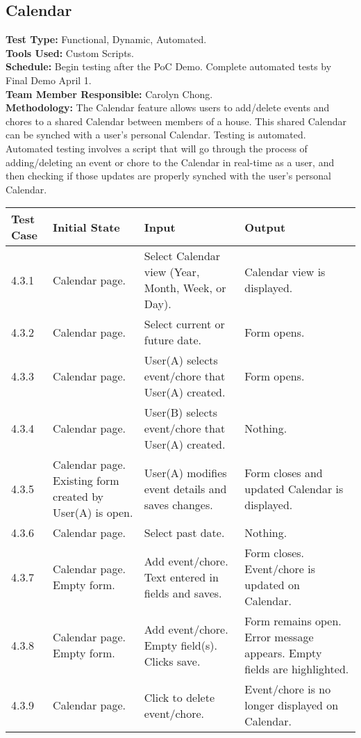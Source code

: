 \documentclass[12pt]{article}
\begin{document}
\subsection{Calendar}
\textbf{Test Type:} Functional, Dynamic, Automated. \\
\textbf{Tools Used:} Custom Scripts. \\
\textbf{Schedule:} Begin testing after the PoC Demo. Complete automated tests by Final Demo April 1. \\
\textbf{Team Member Responsible:} Carolyn Chong. \\
\textbf{Methodology:} The Calendar feature allows users to add/delete events and chores to a shared Calendar between members of a house. This shared Calendar can be synched with a user's personal Calendar. Testing is automated. Automated testing involves a script that will go through the process of adding/deleting an event or chore to the Calendar in real-time as a user, and then checking if those updates are properly synched with the user's personal Calendar. 

\begin{longtable}{|p{2cm}|p{3cm}|p{5cm}|p{5cm}|}
\hline
\textbf{Test Case}  & \textbf{Initial State} & \textbf{Input} & \textbf{Output} \\ \hline
4.3.1 & Calendar page. & Select Calendar view (Year, Month, Week, or Day). & Calendar view is displayed. \\ 
\hline
4.3.2 & Calendar page. & Select current or future date. & Form opens. \\ 
\hline
4.3.3 & Calendar page. & User(A) selects event/chore that User(A) created. & Form opens. \\ 
\hline
4.3.4 & Calendar page. & User(B) selects event/chore that User(A) created. & Nothing. \\ 
\hline
4.3.5 & Calendar page. Existing form created by User(A) is open. & User(A) modifies event details and saves changes. & Form closes and updated Calendar is displayed. \\ 
\hline
4.3.6 & Calendar page. & Select past date. & Nothing. \\ 
\hline
4.3.7 & Calendar page. Empty form. & Add event/chore. Text entered in fields and saves. & Form closes. Event/chore is updated on Calendar. \\ 
\hline
4.3.8 & Calendar page. Empty form. & Add event/chore. Empty field(s). Clicks save. & Form remains open. Error message appears. Empty fields are highlighted. \\
\hline
4.3.9 & Calendar page. & Click to delete event/chore. & Event/chore is no longer displayed on Calendar. \\
\hline
\end{longtable}
\end{document}
